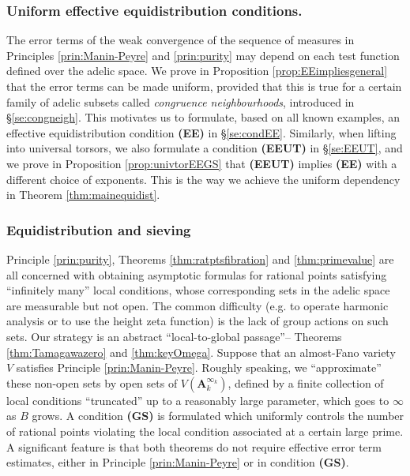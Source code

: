 \documentclass[11pt,letterpaper]{amsart}
\newcommand{\RA}{{\mathbf {A}}}
\theoremstyle{plain}
\numberwithin{equation}{section}
\theoremstyle{definition}
\theoremstyle{remark}
\begin{document}
\subsubsection{Uniform effective equidistribution conditions.}
The error terms of the weak convergence of the sequence of measures in Principles \ref{prin:Manin-Peyre} and \ref{prin:purity} may depend on each test function defined over the adelic space. We prove in Proposition \ref{prop:EEimpliesgeneral} that the error terms can be made uniform, provided that this is true  for a certain family of adelic subsets called \emph{congruence neighbourhoods}, introduced in \S\ref{se:congneigh}. This motivates us to formulate, based on all known examples, an effective equidistribution condition \textbf{(EE)} in \S\ref{se:condEE}.  Similarly, when lifting into universal torsors, we also formulate a condition \textbf{(EEUT)} in \S\ref{se:EEUT}, and we prove in Proposition \ref{prop:univtorEEGS} that \textbf{(EEUT)} implies \textbf{(EE)} with a different choice of exponents. This is the way we achieve the uniform dependency in Theorem \ref{thm:mainequidist}.

\subsubsection{Equidistribution and sieving}
Principle \ref{prin:purity}, Theorems \ref{thm:ratptsfibration} and \ref{thm:primevalue} are all  concerned with obtaining asymptotic formulas for rational points satisfying ``infinitely many'' local conditions, whose corresponding sets in the adelic space are measurable but not open. The common difficulty (e.g. to operate harmonic analysis or to use the height zeta function) is the lack of group actions on such sets. Our strategy is an abstract ``local-to-global passage''-- Theorems \ref{thm:Tamagawazero} and \ref{thm:keyOmega}. Suppose that an almost-Fano variety $V$ satisfies Principle \ref{prin:Manin-Peyre}.  Roughly speaking,  we ``approximate'' these non-open sets by open sets of $V(\RA_k^{\infty_k})$, defined by a finite collection of local conditions ``truncated'' up to a reasonably large parameter, which goes to $\infty$ as $B$ grows. A condition \textbf{(GS)} is formulated which uniformly controls the number of rational points violating the local condition associated at a certain large prime. A significant feature is that both theorems do not require effective error term estimates, either in Principle \ref{prin:Manin-Peyre} or in condition \textbf{(GS)}. 
\end{document}
